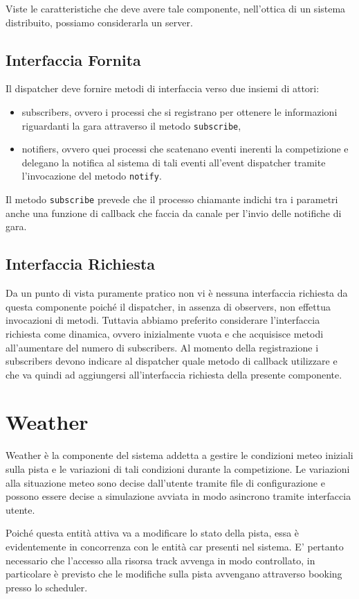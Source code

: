 \documentclass[11pt,a4paper]{report}
\newcommand{\fun}[1]{\texttt{#1}}
\begin{document}
Viste le caratteristiche che deve avere tale componente, nell'ottica di un sistema distribuito, possiamo considerarla un server.
\subsection*{Interfaccia Fornita}
Il dispatcher deve fornire metodi di interfaccia verso due insiemi di attori:
\begin{itemize}
\item subscribers, ovvero i processi che si registrano per ottenere le informazioni riguardanti la gara attraverso il metodo \fun{subscribe},
\item notifiers, ovvero quei processi che scatenano eventi inerenti la competizione e delegano la notifica al sistema di tali eventi all'event dispatcher tramite l'invocazione del metodo \fun{notify}.
\end{itemize}
Il metodo \fun{subscribe} prevede che il processo chiamante indichi tra i parametri anche una funzione di callback che faccia da canale per l'invio delle notifiche di gara.

\subsection*{Interfaccia Richiesta}
Da un punto di vista puramente pratico non vi è nessuna interfaccia richiesta da questa componente poiché il dispatcher, in assenza di observers, non effettua invocazioni di metodi. Tuttavia abbiamo preferito considerare l'interfaccia richiesta come dinamica, ovvero inizialmente vuota e che acquisisce metodi all'aumentare del numero di subscribers. Al momento della registrazione i subscribers devono indicare al dispatcher quale metodo di callback utilizzare e che va quindi ad aggiungersi all'interfaccia richiesta della presente componente.
\section{Weather}
Weather è la componente del sistema addetta a gestire le condizioni meteo iniziali sulla pista e le variazioni di tali condizioni durante la competizione. Le variazioni alla situazione meteo sono decise dall'utente tramite file di configurazione e possono essere decise a simulazione avviata in modo asincrono tramite interfaccia utente.

Poiché questa entità attiva va a modificare lo stato della pista, essa è evidentemente in concorrenza con le entità car presenti nel sistema. E' pertanto necessario che l'accesso alla risorsa track avvenga in modo controllato, in particolare è previsto che le modifiche sulla pista avvengano attraverso booking presso lo scheduler.
\end{document}
